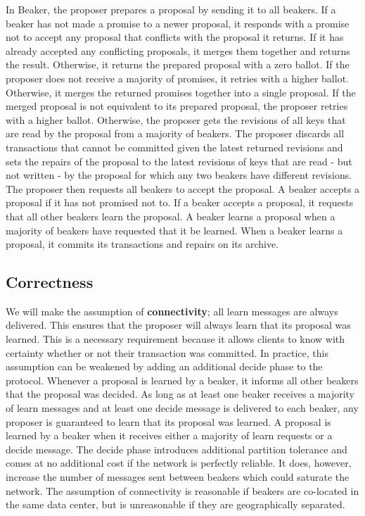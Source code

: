 \documentclass[../main.tex]{subfiles}
\begin{document}
  In Beaker, the proposer prepares a proposal by sending it to all beakers. If a beaker has not
  made a promise to a newer proposal, it responds with a promise not to accept any proposal that
  conflicts with the proposal it returns. If it has already accepted any conflicting proposals, it
  merges them together and returns the result. Otherwise, it returns the prepared proposal with a
  zero ballot. If the proposer does not receive a majority of promises, it retries with a higher
  ballot. Otherwise, it merges the returned promises together into a single proposal. If the
  merged proposal is not equivalent to its prepared proposal, the proposer retries with a higher
  ballot. Otherwise, the proposer gets the revisions of all keys that are read by the proposal
  from a majority of beakers. The proposer discards all transactions that cannot be committed
  given the latest returned revisions and sets the repairs of the proposal to the latest revisions
  of keys that are read - but not written - by the proposal for which any two beakers have
  different revisions. The proposer then requests all beakers to accept the proposal. A
  beaker accepts a proposal if it has not promised not to. If a beaker accepts a proposal, it
  requests that all other beakers learn the proposal. A beaker learns a proposal when a majority
  of beakers have requested that it be learned. When a beaker learns a proposal, it commits its
  transactions and repairs on its archive.

  \subsection{Correctness}
  We will make the assumption of \textbf{connectivity}; all learn messages are always delivered.
  This ensures that the proposer will always learn that its proposal was learned. This is a
  necessary requirement because it allows clients to know with certainty whether or not their
  transaction was committed. In practice, this assumption can be weakened by adding an additional
  decide phase to the protocol. Whenever a proposal is learned by a beaker, it informs all other
  beakers that the proposal was decided. As long as at least one beaker receives a majority of
  learn messages and at least one decide message is delivered to each beaker, any proposer is
  guaranteed to learn that its proposal was learned. A proposal is learned by a beaker when it
  receives either a majority of learn requests or a decide message. The decide phase introduces
  additional partition tolerance and comes at no additional cost if the network is perfectly
  reliable. It does, however, increase the number of messages sent between beakers which could
  saturate the network. The assumption of connectivity is reasonable if beakers are co-located in
  the same data center, but is unreasonable if they are geographically separated.
\end{document}
